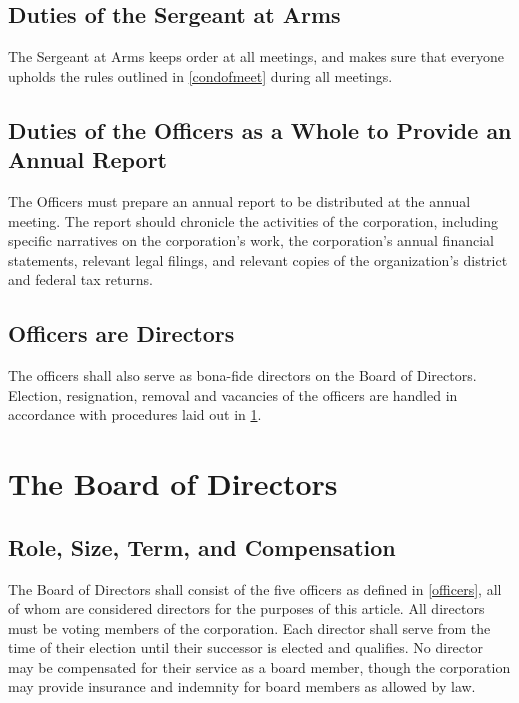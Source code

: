 \documentclass[10pt,letterpaper,titlepage]{article}
\begin{document}
\subsection{Duties of the Sergeant at Arms}

The Sergeant at Arms keeps order at all meetings, and makes sure that everyone
upholds the rules outlined in \ref{condofmeet} during all meetings.

\subsection{Duties of the Officers as a Whole to Provide an Annual Report}

The Officers must prepare an annual report to be distributed at the annual
meeting.
The report should chronicle the activities of the corporation, including
specific narratives on the corporation's work, the corporation's annual
financial statements, relevant legal filings, and relevant copies of the
organization's district and federal tax returns.

\subsection{Officers are Directors}

The officers shall also serve as bona-fide directors on the Board of Directors.
Election, resignation, removal and vacancies of the officers are handled in
accordance with procedures laid out in \ref{boardofdirect}.

\section{The Board of Directors}
\label{boardofdirect}

\subsection{Role, Size, Term, and Compensation}

The Board of Directors shall consist of the five officers as defined in
\ref{officers}, all of whom are considered directors for the purposes of this
article.
All directors must be voting members of the corporation.
Each director shall serve from the time of their election until their successor
is elected and qualifies.
No director may be compensated for their service as a board member, though the
corporation may provide insurance and indemnity for board members as allowed by
law.
\end{document}

